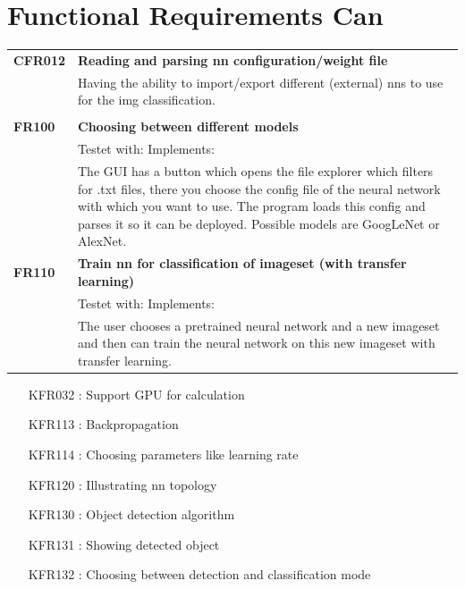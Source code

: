 \documentclass[parskip=full]{scrartcl}
\begin{document}
\section{Functional Requirements Can}
\begin{tabular}{p{2cm}p{12cm}}
\textbf{CFR012} & \textbf{Reading and parsing \gls{nn} configuration/weight file}\\
& Having the ability to import/export different (external) \glspl{nn} to use for the \gls{img} classification.\\
& \\
\textbf{FR100} & \textbf{Choosing between different models}\\
& Testet with: Implements: \\
& The GUI has a button which opens the file explorer which filters for .txt files, there you choose the config file of the neural network with which you want to use. The program loads this config and parses it so it can be deployed. Possible models are GoogLeNet or AlexNet.\\
\textbf{FR110} & \textbf{Train nn for classification of imageset (with transfer learning)}\\
& Testet with: Implements: \\
& The user chooses a pretrained neural network and a new imageset and then can train the neural network on this new imageset with transfer learning.\\


\end{tabular}
\begin{itemize}[nosep]
\item [KFR032]: Support GPU for calculation
\item [KFR113]: Backpropagation
\item [KFR114]: Choosing parameters like learning rate
\item [KFR120]: Illustrating nn topology
\item [KFR130]: Object detection algorithm
\item [KFR131]: Showing detected object
\item [KFR132]: Choosing between detection and classification mode

\end{itemize}
\end{document}
